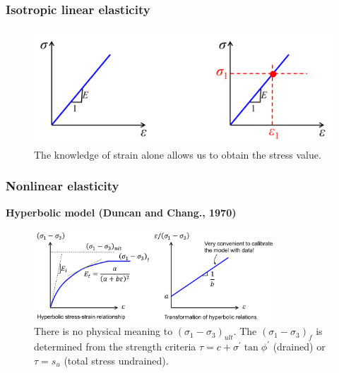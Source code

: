 \documentclass[handout]{beamer}
\begin{document}
\begin{frame}
\frametitle{Isotropic linear elasticity}
\begin{figure}
	\includegraphics[width=\textwidth]{figs/linear-elasticity.png}
	\caption*{The knowledge of strain alone allows us to obtain the stress value.}
\end{figure}
\end{frame}

\begin{frame}
\frametitle{Nonlinear elasticity}
\textbf{Hyperbolic model (Duncan and Chang., 1970)}
\begin{figure}
	\includegraphics[width=0.8\textwidth]{figs/hyperbolic.png}
	\caption*{There is no physical meaning to $(\sigma_1 - \sigma_3)_{ult}$. The $(\sigma_1 - \sigma_3)_f$ is determined from the strength criteria $\tau = c + \sigma^\prime \tan \phi^\prime$ (drained) or $\tau = s_u$ (total stress undrained).}
\end{figure}
\end{frame}
\end{document}

